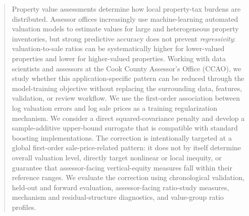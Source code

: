 \documentclass[10pt]{article}
\theoremstyle{definition}
\newcommand{\1}{\mathbf{1}}
\newcommand{\oldtext}[1]{\textcolor{blue}{\sout{#1}}}
\newcommand{\newtext}[1]{\textcolor{impGreen}{#1}}
\begin{document}
\begin{abstract}
Property value assessments determine how local property-tax burdens are distributed.
Assessor offices increasingly use machine-learning automated valuation models to
estimate values for large and heterogeneous property inventories, but strong
\newtext{predictive accuracy does not prevent \emph{regressivity}: valuation-to-sale ratios can be systematically higher for lower-valued properties and lower for higher-valued properties.}
Working with data scientists and assessors at the Cook County Assessor's Office (CCAO), we study whether this application-specific pattern can be reduced through the model-training objective without replacing the surrounding data, features, validation, or review workflow. We use the first-order association between log valuation errors and log sale prices as a training regularization mechanism. We consider a direct squared-covariance penalty and develop a sample-additive upper-bound surrogate that is compatible with standard boosting implementations. 
\newtext{The correction is intentionally targeted at a global first-order sale-price-related pattern: it does not by itself determine overall valuation level, directly target nonlinear or local inequity, or guarantee that assessor-facing vertical-equity measures fall within their reference ranges.} 
\newtext{We evaluate the correction using chronological validation, held-out and forward evaluation, assessor-facing ratio-study measures, mechanism and residual-structure diagnostics, and value-group ratio profiles.} 

\end{abstract}
\end{document}
